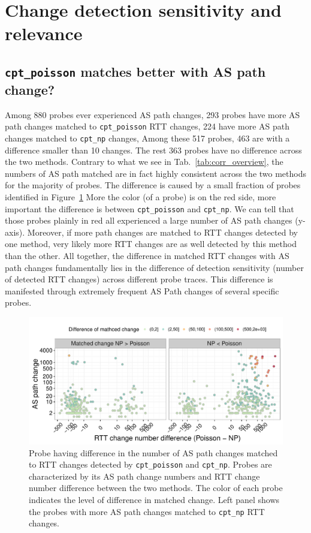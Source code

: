 \section{Change detection sensitivity and relevance}
\subsection{\texttt{cpt\_poisson} matches better with AS path change?}
\label{sec:as_match_diff}
Among 880 probes ever experienced AS path changes, 293 probes have more AS path changes matched to \texttt{cpt\_poisson} RTT changes, 224 have more AS path changes matched to \texttt{cpt\_np} changes, 
Among these 517 probes, 463 are with a difference smaller than 10 changes.
The rest 363 probes have no difference across the two methods.
Contrary to what we see in Tab.~\ref{tab:corr_overview}, the numbers of AS path matched are in fact highly consistent across the two methods for the majority of probes.
The difference is caused by a small fraction of probes identified in Figure~\ref{fig:as_match_diff}
More the color (of a probe) is on the red side, more important the difference is between \texttt{cpt\_poisson} and \texttt{cpt\_np}.
We can tell that those probes plainly in red all experienced a large number of AS path changes (y-axis).
Moreover, if more path changes are matched to RTT changes detected by one method, very likely more RTT changes are as well detected by this method than the other.
All together, the difference in matched RTT changes with AS path changes fundamentally lies in the difference of detection sensitivity (number of detected RTT changes) across different probe traces. This difference is manifested through extremely frequent AS Path changes of several specific probes.

\begin{figure}[!htb]
\centering
\includegraphics[width=.96\textwidth]{gfx/chap4/as_match_diff.pdf}
\caption{Probe having difference in the number of AS path changes matched to RTT changes detected by \texttt{cpt\_poisson} and \texttt{cpt\_np}. Probes are characterized by its AS path change numbers and RTT change number difference between the two methods. The color of each probe indicates the level of difference in matched change. Left panel shows the probes with more AS path changes matched to \texttt{cpt\_np} RTT changes.}
\label{fig:as_match_diff}
\end{figure}

